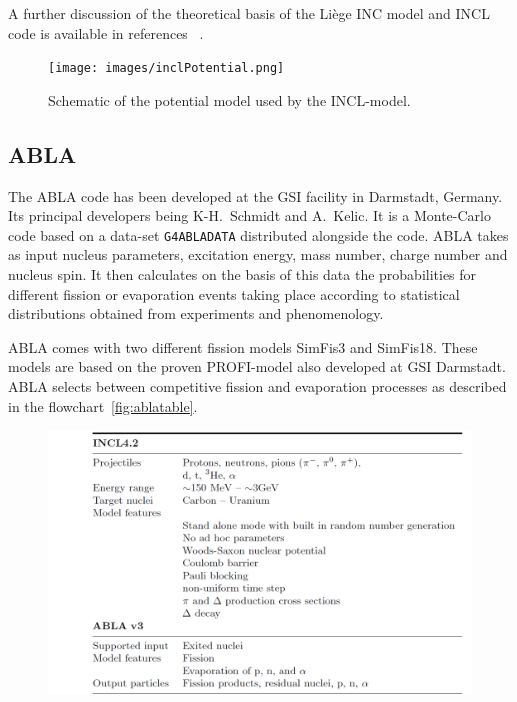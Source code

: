 A further discussion of the theoretical basis of the Liège INC model and INCL code is available in references ~\cite{PhysRevC.66.044615,iia}.

\begin{figure}[ht]
\begin{center}
\texttt{[image: images/inclPotential.png]}  
\caption{\label{fig:inclpotential} Schematic of the potential model used by the INCL-model.}
 
 \end{center}
 \end{figure}


\subsection{ABLA}

The ABLA code has been developed at the GSI facility in Darmstadt, Germany. Its principal developers being K-H.~Schmidt and A.~Kelic. It is a Monte-Carlo code based on a data-set {\tt G4ABLADATA} distributed alongside the code. ABLA takes as input nucleus parameters, excitation energy, mass number, charge number and nucleus spin. It then calculates on the basis of this data the probabilities for different fission or evaporation events taking place according to statistical distributions obtained from experiments and phenomenology.

ABLA comes with two different fission models SimFis3 and SimFis18. These models are based on the proven PROFI-model also developed at GSI Darmstadt. ABLA selects between competitive fission and evaporation processes as described in the flowchart~\ref{fig:ablatable}.

\begin{figure}[h] 
\begin{center}
\includegraphics[width=1\textwidth]{images/inclSummary.png}  
\caption{\label{fig:inclpotential}}
 
 \end{center}
 \end{figure}

